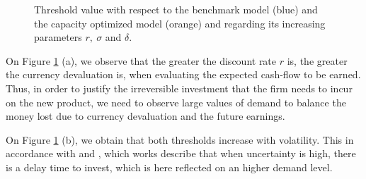 


\begin{figure}[!htb]
	\begin{subfigmatrix}{3}
	\end{subfigmatrix}
	\caption{Threshold value with respect to the benchmark model (blue) and the capacity optimized model (orange) and regarding its increasing parameters $r, \ \sigma$ and $\delta$.}
	\label{fig:sigm}
\end{figure}
On Figure \ref{fig:sigm} (a), we observe that the greater the discount rate $r$ is, the greater the currency devaluation is, when evaluating the expected cash-flow to be earned. Thus, in order to justify the irreversible investment that the firm needs to incur on the new product, we need to observe large values of demand to balance the money lost due to currency devaluation and the future earnings.

On Figure \ref{fig:sigm} (b), we obtain that both thresholds increase with volatility. This in accordance with \cite{hagspiel:cap} and \cite{rita}, which works describe that when uncertainty is high, there is a delay time to invest, which is here reflected on an higher demand level.

